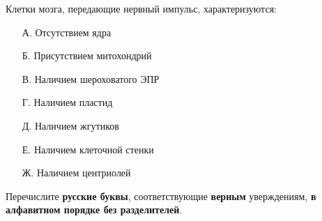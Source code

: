 
Клетки мозга, передающие нервный импульс, характеризуются:
\begin{enumerate}
    \item[А.] Отсутствием ядра
    \item[Б.] Присутствием митохондрий
    \item[В.] Наличием шероховатого ЭПР
    \item[Г.] Наличием пластид
    \item[Д.] Наличием жгутиков
    \item[Е.] Наличием клеточной стенки
    \item[Ж.] Наличием центриолей
\end{enumerate} 

Перечислите \textbf{русские буквы}, соответствующие \textbf{верным} уверждениям, \textbf{в алфавитном порядке без разделителей}.

